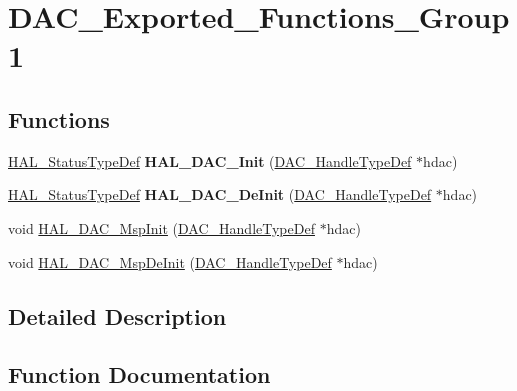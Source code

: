 \hypertarget{group___d_a_c___exported___functions___group1}{}\section{D\+A\+C\+\_\+\+Exported\+\_\+\+Functions\+\_\+\+Group1}
\label{group___d_a_c___exported___functions___group1}
\subsection*{Functions}
\begin{DoxyCompactItemize}
\item 
\mbox{\label{group___d_a_c___exported___functions___group1_ga6be386704db79d8df98e631fac3348c3}} 
\mbox{\hyperlink{stm32f7xx__hal__def_8h_a63c0679d1cb8b8c684fbb0632743478f}{H\+A\+L\+\_\+\+Status\+Type\+Def}} {\bfseries H\+A\+L\+\_\+\+D\+A\+C\+\_\+\+Init} (\mbox{\hyperlink{struct_d_a_c___handle_type_def}{D\+A\+C\+\_\+\+Handle\+Type\+Def}} $\ast$hdac)
\item 
\mbox{\label{group___d_a_c___exported___functions___group1_gaa4594a7fa91599afeb846ec016194662}} 
\mbox{\hyperlink{stm32f7xx__hal__def_8h_a63c0679d1cb8b8c684fbb0632743478f}{H\+A\+L\+\_\+\+Status\+Type\+Def}} {\bfseries H\+A\+L\+\_\+\+D\+A\+C\+\_\+\+De\+Init} (\mbox{\hyperlink{struct_d_a_c___handle_type_def}{D\+A\+C\+\_\+\+Handle\+Type\+Def}} $\ast$hdac)
\item 
void \mbox{\hyperlink{group___d_a_c___exported___functions___group1_gacd409f887681168e93817e8a5485d74b}{H\+A\+L\+\_\+\+D\+A\+C\+\_\+\+Msp\+Init}} (\mbox{\hyperlink{struct_d_a_c___handle_type_def}{D\+A\+C\+\_\+\+Handle\+Type\+Def}} $\ast$hdac)
\item 
void \mbox{\hyperlink{group___d_a_c___exported___functions___group1_ga4caf761f179e82f99674ef63643340f3}{H\+A\+L\+\_\+\+D\+A\+C\+\_\+\+Msp\+De\+Init}} (\mbox{\hyperlink{struct_d_a_c___handle_type_def}{D\+A\+C\+\_\+\+Handle\+Type\+Def}} $\ast$hdac)
\end{DoxyCompactItemize}


\subsection{Detailed Description}


\subsection{Function Documentation}
\mbox{\label{group___d_a_c___exported___functions___group1_ga4caf761f179e82f99674ef63643340f3}} 
